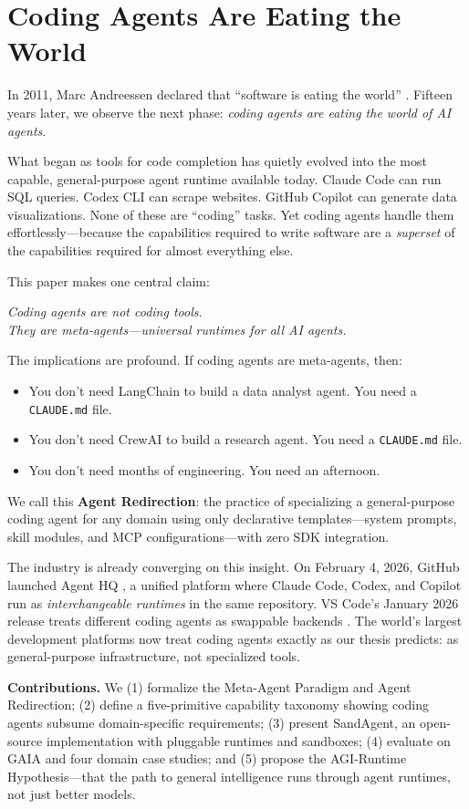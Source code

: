 \section{Coding Agents Are Eating the World}

In 2011, Marc Andreessen declared that ``software is eating the world'' \citep{andreessen2011software}. Fifteen years later, we observe the next phase: \textit{coding agents are eating the world of AI agents}.

What began as tools for code completion has quietly evolved into the most capable, general-purpose agent runtime available today. Claude Code can run SQL queries. Codex CLI can scrape websites. GitHub Copilot can generate data visualizations. None of these are ``coding'' tasks. Yet coding agents handle them effortlessly---because the capabilities required to write software are a \textit{superset} of the capabilities required for almost everything else.

This paper makes one central claim:

\begin{center}
\large
\textit{Coding agents are not coding tools.\\They are meta-agents---universal runtimes for all AI agents.}
\end{center}

The implications are profound. If coding agents are meta-agents, then:

\begin{itemize}[nosep]
\item You don't need LangChain to build a data analyst agent. You need a \texttt{CLAUDE.md} file.
\item You don't need CrewAI to build a research agent. You need a \texttt{CLAUDE.md} file.
\item You don't need months of engineering. You need an afternoon.
\end{itemize}

We call this \textbf{Agent Redirection}: the practice of specializing a general-purpose coding agent for any domain using only declarative templates---system prompts, skill modules, and MCP configurations---with zero SDK integration.

The industry is already converging on this insight. On February 4, 2026, GitHub launched Agent HQ \citep{github2026agenthq}, a unified platform where Claude Code, Codex, and Copilot run as \textit{interchangeable runtimes} in the same repository. VS Code's January 2026 release treats different coding agents as swappable backends \citep{vscode2026multiagent}. The world's largest development platforms now treat coding agents exactly as our thesis predicts: as general-purpose infrastructure, not specialized tools.

\textbf{Contributions.} We (1) formalize the Meta-Agent Paradigm and Agent Redirection; (2) define a five-primitive capability taxonomy showing coding agents subsume domain-specific requirements; (3) present SandAgent, an open-source implementation with pluggable runtimes and sandboxes; (4) evaluate on GAIA and four domain case studies; and (5) propose the AGI-Runtime Hypothesis---that the path to general intelligence runs through agent runtimes, not just better models.
